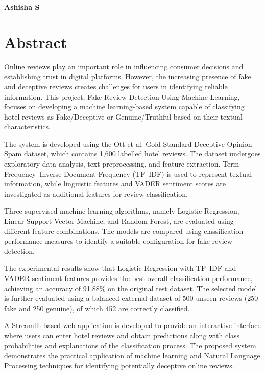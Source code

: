 \documentclass[12pt,a4paper]{report}
\begin{document}
\begin{flushright}
\textbf{Ashisha S}\\
\end{flushright}


\newpage

\chapter*{Abstract}
{}

Online reviews play an important role in influencing
consumer decisions and establishing trust in digital
platforms. However, the increasing presence of fake
and deceptive reviews creates challenges for users
in identifying reliable information. This project,
Fake Review Detection Using Machine Learning,
focuses on developing a machine learning-based
system capable of classifying hotel reviews as
Fake/Deceptive or Genuine/Truthful based on
their textual characteristics.

The system is developed using the Ott et al.
Gold Standard Deceptive Opinion Spam dataset,
which contains 1,600 labelled hotel reviews.
The dataset undergoes exploratory data analysis,
text preprocessing, and feature extraction.
Term Frequency--Inverse Document Frequency
(TF--IDF) is used to represent textual information,
while linguistic features and VADER sentiment
scores are investigated as additional features
for review classification.

Three supervised machine learning algorithms,
namely Logistic Regression, Linear Support Vector
Machine, and Random Forest, are evaluated using
different feature combinations. The models are
compared using classification performance measures
to identify a suitable configuration for fake
review detection.

The experimental results show that Logistic
Regression with TF--IDF and VADER sentiment
features provides the best overall classification
performance, achieving an accuracy of 91.88\%
on the original test dataset. The selected model
is further evaluated using a balanced external
dataset of 500 unseen reviews (250 fake and
250 genuine), of which 452 are correctly classified.

A Streamlit-based web application is developed
to provide an interactive interface where users
can enter hotel reviews and obtain predictions
along with class probabilities and explanations
of the classification process. The proposed
system demonstrates the practical application
of machine learning and Natural Language
Processing techniques for identifying
potentially deceptive online reviews.
\end{document}
